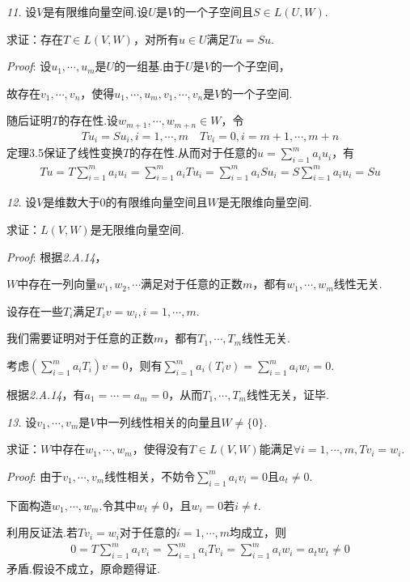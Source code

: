 \textit{11.}
设\(V\)是有限维向量空间.设\(U\)是\(V\)的一个子空间且\(S\in L(U,W)\).

求证：存在\(T\in L(V,W)\)，对所有\(u\in U\)满足\(Tu=Su\).

\textit{Proof}:
设\(u_1,\cdots,u_m\)是\(U\)的一组基.由于\(U\)是\(V\)的一个子空间，

故存在\(v_1,\cdots,v_n\)，使得\(u_1,\cdots,u_m,v_1,\cdots,v_n\)是\(V\)的一个子空间.

随后证明\(T\)的存在性.设\(w_{m+1},\cdots,w_{m+n} \in W\)，令
    \begin{align*}
        Tu_i=Su_i,i=1,\cdots,m \quad Tv_i=0,i=m+1,\cdots,m+n
    \end{align*}
定理3.5保证了线性变换\(T\)的存在性.从而对于任意的\(u=\sum_{i=1}^m a_iu_i\)，有
    \begin{align*}
        Tu=T\sum_{i=1}^m a_iu_i=\sum_{i=1}^m a_iTu_i=\sum_{i=1}^m a_iSu_i=S\sum_{i=1}^m a_iu_i=Su
    \end{align*}

\hspace*{\fill}

\textit{12.}
设\(V\)是维数大于0的有限维向量空间且\(W\)是无限维向量空间.

求证：\(L(V,W)\)是无限维向量空间.

\textit{Proof}:
根据\textit{2.A.14}，

\(W\)中存在一列向量\(w_1,w_2,\cdots\)满足对于任意的正数\(m\)，都有\(w_1,\cdots,w_m\)线性无关.

设存在一些\(T_i\)满足\(T_iv=w_i,i=1,\cdots,m\).

我们需要证明对于任意的正数\(m\)，都有\(T_1,\cdots,T_m\)线性无关.

考虑\((\sum_{i=1}^m a_iT_i)v=0\)，则有\(\sum_{i=1}^m a_i(T_iv)=\sum_{i=1}^m a_iw_i=0\).

根据\textit{2.A.14}，有\(a_1=\cdots=a_m=0\)，从而\(T_1,\cdots,T_m\)线性无关，证毕.

\hspace*{\fill}

\textit{13.}
设\(v_1,\cdots,v_m\)是\(V\)中一列线性相关的向量且\(W \ne \{0\}\).

求证：\(W\)中存在\(w_1,\cdots,w_m\)，使得没有\(T\in L(V,W)\)能满足\(\forall i=1,\cdots,m,Tv_i=w_i\).

\textit{Proof}:
由于\(v_1,\cdots,v_m\)线性相关，不妨令\(\sum_{i=1}^m a_iv_i=0\)且\(a_t \ne 0\).

下面构造\(w_1,\cdots,w_m\).令其中\(w_t \ne 0\)，且\(w_i=0\)若\(i \ne t\).

利用反证法.若\(Tv_i=w_i\)对于任意的\(i=1,\cdots,m\)均成立，则
    \begin{align*}
        0=T\sum_{i=1}^m a_iv_i=\sum_{i=1}^m a_iTv_i=\sum_{i=1}^m a_iw_i=a_tw_t \ne 0
    \end{align*}
矛盾.假设不成立，原命题得证.